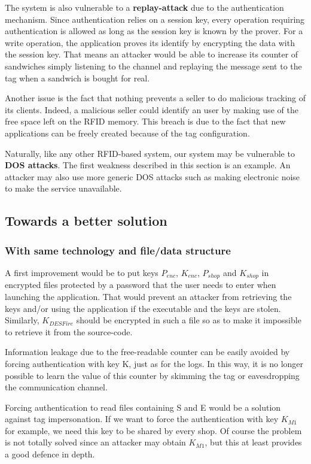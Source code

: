 \documentclass[a4paper,11pt,oneside]{article}
\begin{document}
The system is also vulnerable to a \textbf{replay-attack} due to the authentication mechanism. Since authentication relies on a session key, every operation requiring authentication is allowed as long as the session key is known by the prover. For a write operation, the application proves its identify by encrypting the data with the session key. That means an attacker would be able to increase its counter of sandwiches simply listening to the channel and replaying the message sent to the tag when a sandwich is bought for real. 

Another issue is the fact that nothing prevents a seller to do malicious
tracking of its clients. Indeed, a malicious seller could identify an user by
making use of the free space left on the RFID memory. This breach is due to the
fact that new applications can be freely created because of the tag
configuration. 

Naturally, like any other RFID-based system, our system may be vulnerable to \textbf{DOS attacks}. The first weakness described in this section is an example. An attacker may also use more generic DOS attacks such as making electronic noise to make the service unavailable. 

\newpage
\subsection{Towards a better solution}

\subsubsection{With same technology and file/data structure}

A first improvement would be to put keys $P_{enc}$, $K_{enc}$, $P_{shop}$ and $K_{shop}$ in encrypted files protected by a password that the user needs to enter when launching the application. That would prevent an attacker from retrieving the keys and/or using the application if the executable and the keys are stolen. Similarly, $K_{DESFire}$ should be encrypted in such a file so as to make it impossible to retrieve it from the source-code. 

Information leakage due to the free-readable counter can be easily avoided by forcing authentication with key K, just as for the logs. In this way, it is no longer possible to learn the value of this counter by skimming the tag or eavesdropping the communication channel. 

Forcing authentication to read files containing S and E would be a solution against tag impersonation. If we want to force the authentication with key $K_{M1}$ for example, we need this key to be shared by every shop. Of course the problem is not totally solved since an attacker may obtain $K_{M1}$, but this at least provides a good defence in depth. 
\end{document}
